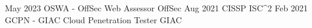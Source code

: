 \documentclass[a4paper]{twentysecondcv} %
\begin{document}
\begin{twenty}
    \twentyitem
    {May 2023}
    {}
    {OSWA - OffSec Web Assessor}
    {OffSec}
    {
    }
    {}
    \twentyitem
    {Aug 2021}
    {}
    {CISSP}
    {ISC^2}
    {}
    {
    }
    {}
    \twentyitem
    {Feb 2021}
    {}
    {GCPN - GIAC Cloud Penetration Tester}
    {GIAC}
    {
    }
    {}
\end{twenty}
\end{document}
